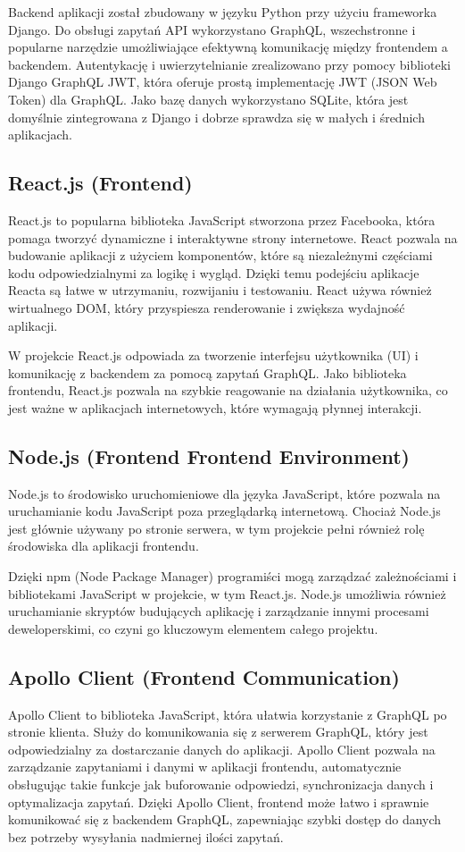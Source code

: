 \documentclass[wmii,inf,inz]{uwmthesis} %
\begin{document}
Backend aplikacji został zbudowany w języku Python przy użyciu frameworka Django. Do obsługi zapytań API wykorzystano GraphQL, wszechstronne i popularne narzędzie umożliwiające efektywną komunikację między frontendem a backendem. Autentykację i uwierzytelnianie zrealizowano przy pomocy biblioteki Django GraphQL JWT, która oferuje prostą implementację JWT (JSON Web Token) dla GraphQL. Jako bazę danych wykorzystano SQLite, która jest domyślnie zintegrowana z Django i dobrze sprawdza się w małych i średnich aplikacjach.
\subsection{React.js (Frontend)}
React.js to popularna biblioteka JavaScript stworzona przez Facebooka, która pomaga tworzyć dynamiczne i interaktywne strony internetowe. React pozwala na budowanie aplikacji z użyciem komponentów, które są niezależnymi częściami kodu odpowiedzialnymi za logikę i wygląd. Dzięki temu podejściu aplikacje Reacta są łatwe w utrzymaniu, rozwijaniu i testowaniu. React używa również wirtualnego DOM, który przyspiesza renderowanie i zwiększa wydajność aplikacji.

W projekcie React.js odpowiada za tworzenie interfejsu użytkownika (UI) i komunikację z backendem za pomocą zapytań GraphQL. Jako biblioteka frontendu, React.js pozwala na szybkie reagowanie na działania użytkownika, co jest ważne w aplikacjach internetowych, które wymagają płynnej interakcji.
\subsection{Node.js (Frontend Frontend Environment)}
Node.js to środowisko uruchomieniowe dla języka JavaScript, które pozwala na uruchamianie kodu JavaScript poza przeglądarką internetową. Chociaż Node.js jest głównie używany po stronie serwera, w tym projekcie pełni również rolę środowiska dla aplikacji frontendu.

Dzięki npm (Node Package Manager) programiści mogą zarządzać zależnościami i bibliotekami JavaScript w projekcie, w tym React.js. Node.js umożliwia również uruchamianie skryptów budujących aplikację i zarządzanie innymi procesami deweloperskimi, co czyni go kluczowym elementem całego projektu.
\subsection{Apollo Client (Frontend Communication)}
Apollo Client to biblioteka JavaScript, która ułatwia korzystanie z GraphQL po stronie klienta. Służy do komunikowania się z serwerem GraphQL, który jest odpowiedzialny za dostarczanie danych do aplikacji. Apollo Client pozwala na zarządzanie zapytaniami i danymi w aplikacji frontendu, automatycznie obsługując takie funkcje jak buforowanie odpowiedzi, synchronizacja danych i optymalizacja zapytań. Dzięki Apollo Client, frontend może łatwo i sprawnie komunikować się z backendem GraphQL, zapewniając szybki dostęp do danych bez potrzeby wysyłania nadmiernej ilości zapytań.
\end{document}
